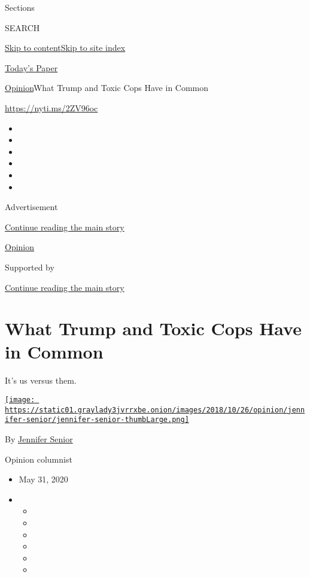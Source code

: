 Sections

SEARCH

\protect\hyperlink{site-content}{Skip to
content}\protect\hyperlink{site-index}{Skip to site index}

\href{https://myaccount.nytimes3xbfgragh.onion/auth/login?response_type=cookie\&client_id=vi}{}

\href{https://www.nytimes3xbfgragh.onion/section/todayspaper}{Today's
Paper}

\href{/section/opinion}{Opinion}\textbar{}What Trump and Toxic Cops Have
in Common

\url{https://nyti.ms/2ZV96oc}

\begin{itemize}
\item
\item
\item
\item
\item
\item
\end{itemize}

Advertisement

\protect\hyperlink{after-top}{Continue reading the main story}

\href{/section/opinion}{Opinion}

Supported by

\protect\hyperlink{after-sponsor}{Continue reading the main story}

\hypertarget{what-trump-and-toxic-cops-have-in-common}{%
\section{What Trump and Toxic Cops Have in
Common}\label{what-trump-and-toxic-cops-have-in-common}}

It's us versus them.

\href{https://www.nytimes3xbfgragh.onion/by/jennifer-senior}{\texttt{[image: https://static01.graylady3jvrrxbe.onion/images/2018/10/26/opinion/jennifer-senior/jennifer-senior-thumbLarge.png]}}

By \href{https://www.nytimes3xbfgragh.onion/by/jennifer-senior}{Jennifer
Senior}

Opinion columnist

\begin{itemize}
\item
  May 31, 2020
\item
  \begin{itemize}
  \item
  \item
  \item
  \item
  \item
  \item
  \end{itemize}
\end{itemize}

